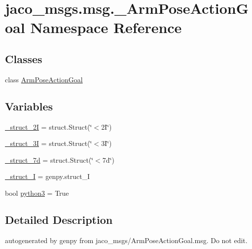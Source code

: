 \hypertarget{namespacejaco__msgs_1_1msg_1_1__ArmPoseActionGoal}{}\section{jaco\+\_\+msgs.\+msg.\+\_\+\+Arm\+Pose\+Action\+Goal Namespace Reference}
\label{namespacejaco__msgs_1_1msg_1_1__ArmPoseActionGoal}
\subsection*{Classes}
\begin{DoxyCompactItemize}
\item 
class \hyperlink{classjaco__msgs_1_1msg_1_1__ArmPoseActionGoal_1_1ArmPoseActionGoal}{Arm\+Pose\+Action\+Goal}
\end{DoxyCompactItemize}
\subsection*{Variables}
\begin{DoxyCompactItemize}
\item 
\hyperlink{namespacejaco__msgs_1_1msg_1_1__ArmPoseActionGoal_a54f6fe8e28a84e9b7492d56ae0c1a8e1}{\+\_\+struct\+\_\+2I} = struct.\+Struct(\char`\"{}$<$2\+I\char`\"{})
\item 
\hyperlink{namespacejaco__msgs_1_1msg_1_1__ArmPoseActionGoal_a16ab497b80e41b20765c91f3d5dff63f}{\+\_\+struct\+\_\+3I} = struct.\+Struct(\char`\"{}$<$3\+I\char`\"{})
\item 
\hyperlink{namespacejaco__msgs_1_1msg_1_1__ArmPoseActionGoal_a91b19221710bf188dcc3450fedb41cbc}{\+\_\+struct\+\_\+7d} = struct.\+Struct(\char`\"{}$<$7d\char`\"{})
\item 
\hyperlink{namespacejaco__msgs_1_1msg_1_1__ArmPoseActionGoal_a411b8f5fab463c221ba6c839e37e6b3e}{\+\_\+struct\+\_\+I} = genpy.\+struct\+\_\+I
\item 
bool \hyperlink{namespacejaco__msgs_1_1msg_1_1__ArmPoseActionGoal_af488dbf1eb6c65d727bb732caee65289}{python3} = True
\end{DoxyCompactItemize}


\subsection{Detailed Description}
\begin{DoxyVerb}autogenerated by genpy from jaco_msgs/ArmPoseActionGoal.msg. Do not edit.\end{DoxyVerb}
 

